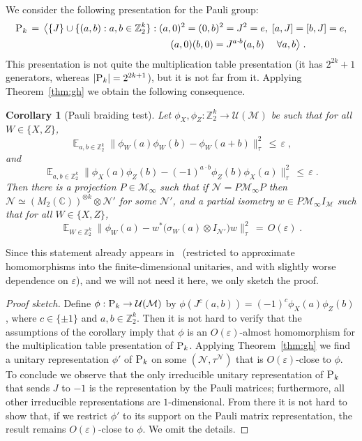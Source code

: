 \documentclass[11pt]{article}
\newtheorem{corollary}[theorem]{Corollary}
\theoremstyle{definition}
\newcommand{\Id}{\ensuremath{I}}
\DeclareMathOperator*{\Expectation}{\mathbb{E}}
\newcommand{\Es}[1]{\Expectation_{#1}}
\newcommand{\C}{\ensuremath{\mathbb{C}}}
\newcommand{\Z}{\ensuremath{\mathbb{Z}}}
\newcommand{\mM}{\ensuremath{\mathcal{M}}}
\newcommand{\mU}{\ensuremath{\mathcal{U}}}
\newcommand{\eps}{\varepsilon}
\newcommand{\mN}{\mathcal{N}}
\newcommand{\gamestyle}[1]{\ensuremath{\textsc{#1}}\xspace}
\newcommand{\pauli}{\gamestyle{P}}
\begin{document}
We consider the following presentation for the Pauli group:
\begin{align*}
 \pauli_k \,=\, \big\langle \{J\}\cup  \{(a,b): a,b\in \Z_2^k\} &: (a,0)^2=(0,b)^2=J^2=e,\; [a,J]=[b,J]=e,\\
&\qquad  (a,0)(b,0) = J^{a\cdot b} (a,b) \; \quad \forall a,b\big\rangle\;.
\end{align*}
This presentation is not quite the multiplication table presentation (it has $2^{2k}+1$ generators, whereas $|\pauli_k|=2^{2k+1}$), but it is not far from it.  
Applying Theorem~\ref{thm:gh} we obtain the following consequence.%

\begin{corollary}[Pauli braiding test]
Let $\phi_X,\phi_Z:\Z_2^k \to \mU(\mM)$ be such that for all $W\in \{X,Z\}$,
\[ \Es{a,b\in \Z_2^k} \big\| \phi_W(a)\phi_W(b)-\phi_W(a+b) \big\|_\tau^2 \,\leq\,\eps\;,\]
and
\[ \Es{a,b\in \Z_2^k} \big\| \phi_X(a)\phi_Z(b)- (-1)^{a\cdot b} \phi_Z(b)\phi_X(a) \big\|_{\tau}^2 \,\leq\,\eps\;.\]
Then there is a projection $P\in \mM_\infty$ such that if $\mN=P\mM_\infty P$ then $\mN\simeq (M_2(\C))^{\otimes k} \otimes \mN'$ for some $\mN'$, and a
partial isometry $w\in P\mM_\infty I_\mM$ such that for all $W\in \{X,Z\}$, 
\[ \Es{W\in \Z_2^k} \big\| \phi_W(a) - w^* \big(\sigma_W(a)\otimes \Id_{\mN'}\big) w \big\|_{\tau}^2 \,=\, O(\eps)\;.\]
\end{corollary}

Since this statement already appears in~\cite{natarajan2017quantum} (restricted to approximate homomorphisms into the finite-dimensional unitaries, and with slightly worse dependence on $\eps$), and we will not need it here, we only sketch the proof. 

\begin{proof}[Proof sketch]
Define $\phi:\pauli_k \to \mU(\mM)$ by $\phi(J^c (a,b))= (-1)^c \phi_X(a)\phi_Z(b)$, where $c\in \{\pm 1\}$ and $a,b\in \Z_2^k$. Then it is not hard to verify that the assumptions of the corollary imply that  $\phi$ is an $O(\eps)$-almost homomorphism for the multiplication table presentation of $\pauli_k$. Applying Theorem~\ref{thm:gh} we find a unitary representation $\phi'$ of $\pauli_k$ on some $(\mN,\tau^\mN)$ that is $O(\eps)$-close to $\phi$. To conclude we observe that the only irreducible unitary representation of $\pauli_k$ that sends $J$ to $-1$ is the representation by the Pauli matrices; furthermore, all other irreducible representations are $1$-dimensional. From there it is not hard to show that, if we restrict $\phi'$ to its support on the Pauli matrix representation, the result remains $O(\eps)$-close to $\phi$. We omit the details. 
\end{proof}
\end{document}
